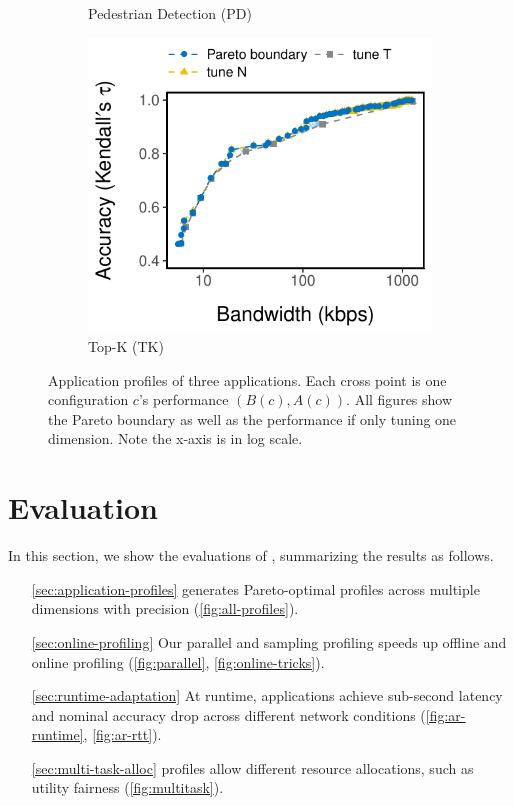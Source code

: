 \begin{figure}[htb]
\begin{subfigure}[t]{0.32\textwidth}
    \caption{Pedestrian Detection (PD)}
    \label{fig:pd-profile}
  \end{subfigure}
  \hfill
  \begin{subfigure}[t]{0.32\textwidth}
    \centering
    \includegraphics[width=\textwidth]{figures/profile-topk.pdf}
    \caption{Top-K (TK)}
    \label{fig:tk-profile}
  \end{subfigure}
  \caption{Application profiles of three applications. Each cross point is one
    configuration $c$'s performance $(B(c), A(c))$. All figures show the Pareto
    boundary as well as the performance if only tuning one dimension. Note the
    x-axis is in log scale.}
  \label{fig:all-profiles}
\end{figure}

\section{Evaluation}
\label{sec:evaluation}

In this section, we show the evaluations of \sysname{}, summarizing the results
as follows.

\begin{itemize}[itemsep=0pt]
\item[\autoref{sec:application-profiles}] \sysname{} generates Pareto-optimal
  profiles across multiple dimensions with precision
  (\autoref{fig:all-profiles}).
\item[\autoref{sec:online-profiling}] Our parallel and sampling profiling speeds
  up offline and online profiling (\autoref{fig:parallel},
  \autoref{fig:online-tricks}).
\item[\autoref{sec:runtime-adaptation}] At runtime, \sysname{} applications
  achieve sub-second latency and nominal accuracy drop across different network
  conditions (\autoref{fig:ar-runtime}, \autoref{fig:ar-rtt}).
\item[\autoref{sec:multi-task-alloc}] \sysname{} profiles allow different
  resource allocations, such as utility fairness (\autoref{fig:multitask}).
\end{itemize}

